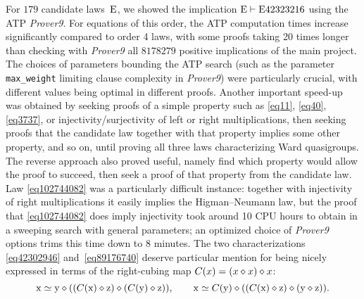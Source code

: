 For $179$ candidate laws~$\mathrm{E}$, we showed the implication $\mathrm{E}\vdash\mathrm{E}42323216$ using the ATP \emph{Prover9}.  For equations of this order, the ATP computation times increase significantly compared to order 4 laws, with some proofs taking 20 times longer than checking with \emph{Prover9} all $\num{8178279}$ positive implications of the main project.  The choices of parameters bounding the ATP search (such as the parameter \texttt{max\_weight} limiting clause complexity in \emph{Prover9}) were particularly crucial, with different values being optimal in different proofs.  Another important speed-up was obtained by seeking proofs of a simple property such as \eqref{eq11}, \eqref{eq40}, \eqref{eq3737}, or injectivity/surjectivity of left or right multiplications, then seeking proofs that the candidate law together with that property implies some other property, and so on, until proving all three laws characterizing Ward quasigroups.  The reverse approach also proved useful, namely find which property would allow the proof to succeed, then seek a proof of that property from the candidate law.  Law \eqref{eq102744082} was a particularly difficult instance: together with injectivity of right multiplications it easily implies the Higman--Neumann law, but the proof that \eqref{eq102744082} does imply injectivity took around 10 CPU hours to obtain in a sweeping search with general parameters; an optimized choice of \emph{Prover9} options trims this time down to 8 minutes.  The two characterizations \eqref{eq42302946} and~\eqref{eq89176740} deserve particular mention for being nicely expressed in terms of the right-cubing map $C(x) = (x \diamond x) \diamond x$:
\[
  \mathrm{x} \simeq \mathrm{y} \diamond ((C(\mathrm{x}) \diamond \mathrm{z}) \diamond (C(\mathrm{y}) \diamond \mathrm{z})) , \qquad
  \mathrm{x} \simeq C(\mathrm{y}) \diamond ((C(\mathrm{x}) \diamond \mathrm{z}) \diamond (\mathrm{y} \diamond \mathrm{z})) .
\]

